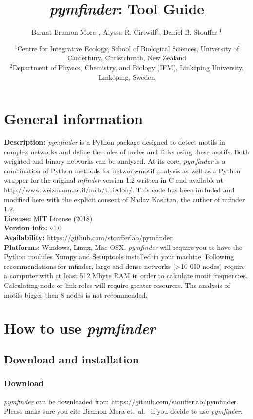 \documentclass[12pt]{article}
\title{\emph{pymfinder}: Tool Guide}
\author{Bernat Bramon Mora$^{1}$, Alyssa R. Cirtwill$^{2}$, Daniel B. Stouffer $^{1}$}
\date{\small
$^1$Centre for Integrative Ecology, School of Biological Sciences, University of Canterbury, Christchurch, New Zealand\\
\medskip
$^2$Department of Physics, Chemistry, and Biology (IFM), Link\"{o}ping University, Link\"{o}ping, Sweden\\ }
\begin{document}
 
\maketitle 
\raggedright
\setlength{\parindent}{15pt} 

\newpage

\setlength{\parindent}{0cm}
\setlength{\parskip}{1em}

\section{General information}
	\textbf{Description:} \textit{pymfinder} is a Python package designed to detect motifs in complex networks and define the roles of nodes and links using these motifs. Both weighted and binary networks can be analyzed. At its core, \emph{pymfinder} is a combination of Python methods for network-motif analysis as well as a Python wrapper for the original \emph{mfinder} version 1.2 written in C and available at \url{http://www.weizmann.ac.il/mcb/UriAlon/}. This code has been included and modified here with the explicit consent of Nadav Kashtan, the author of mfinder 1.2.\\
	\textbf{License:} MIT License (2018)\\
	\textbf{Version info:} v1.0\\
	\textbf{Availability:} \url{https://github.com/stoufferlab/pymfinder}\\
	\textbf{Platforms:} Windows, Linux, Mac OSX. \textit{pymfinder} will require you to have the Python modules Numpy and Setuptools installed in your machine. Following recommendations for mfinder, large and dense networks (\textgreater10 000 nodes) require a computer with at least 512 Mbyte RAM in order to calculate motif frequencies. Calculating node or link roles will require greater resources. The analysis of motifs bigger then 8 nodes is not recommended.

\section{How to use \emph{pymfinder}}
	\subsection{Download and installation}
		\subsubsection{Download}
			\emph{pymfinder} can be downloaded from \url{https://github.com/stoufferlab/pymfinder}. Please make sure you cite Bramon Mora et.\ al.\ \citep{BramonMora364703} if you decide to use \emph{pymfinder}.
\end{document}
